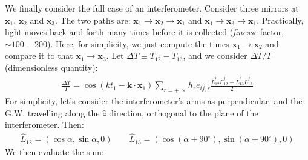 \documentclass[../template.tex]{subfiles}
\begin{document}
\medskip

We finally consider the full case of an interferometer. Consider three mirrors at $\bm{x}_1$, $\bm{x}_2$ and $\bm{x}_3$. The two paths are: $\bm{x}_1 \to \bm{x}_2 \to \bm{x}_1$  and $\bm{x}_1 \to \bm{x}_3 \to \bm{x}_1$. Practically, light moves back and forth many times before it is collected (\textit{finesse} factor, $\sim 100-200$). Here, for simplicity, we just compute the times $\bm{x}_1 \to \bm{x}_2$ and compare it to that $\bm{x}_1 \to \bm{x}_3$. Let $\Delta T \equiv T_{12} - T_{13}$, and we consider $\Delta T/T$ (dimensionless quantity):
\begin{align*}
    \frac{\Delta T}{T}  = \cos(kt_1 - \bm{k} \cdot \bm{x}_1) \sum_{r = +,\times} h_r e_{ij,r} \frac{\hat{L}_{12}^i \hat{L}_{12}^j - \hat{L}_{13}^i \hat{L}_{13}^j}{2} 
\end{align*} 
For simplicity, let's consider the interferometer's arms as perpendicular, and the G.W. travelling along the $\hat{z}$ direction, orthogonal to the plane of the interferometer. Then:
\begin{align*}
    \hat{L}_{12} = (\cos \alpha, \sin \alpha, 0) \qquad \hat{L}_{13} = (\cos(\alpha + 90^\circ), \sin(\alpha + 90^\circ), 0)
\end{align*}
We then evaluate the sum:
\end{document}
